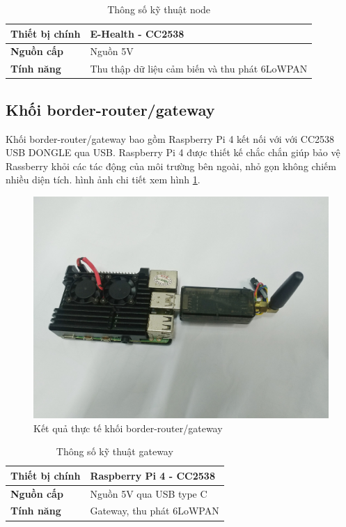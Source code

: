 \documentclass{report}
\begin{document}
\begin{table}[h]
	\centering
	\begin{tabular}{|l|l|}
		\hline
		\multicolumn{1}{|c|}{\textbf{Thiết bị chính}} & E-Health - CC2538                             \\ \hline
		\textbf{Nguồn cấp}                            & Nguồn 5V                                      \\ \hline
		\textbf{Tính năng}                            & Thu thập dữ liệu cảm biến và thu phát 6LoWPAN \\ \hline
	\end{tabular}
	\caption{Thông số kỹ thuật node}
	\label{table:tab5}
\end{table}
\newpage
\subsection{Khối border-router/gateway}
Khối border-router/gateway bao gồm Raspberry Pi 4 kết nối với với CC2538 USB DONGLE qua USB. Raspberry Pi 4 được thiết kế chắc chắn giúp bảo vệ Rassberry khỏi các tác động của môi trường bên ngoài, nhỏ gọn không chiếm nhiều diện tích. hình ảnh chi tiết xem hình \ref{fig:Graph55}. 
\begin{figure}[h]
	\centering
	\includegraphics[scale = 0.1]{fig55.png}
	\caption{Kết quả thực tế khối border-router/gateway}
	\label{fig:Graph55}
\end{figure}

\begin{table}[h]
	\centering
	\label{table:tb4}
	\begin{tabular}{|l|l|}
		\hline
		\multicolumn{1}{|c|}{\textbf{Thiết bị chính}} & Raspberry Pi 4 - CC2538   \\ \hline
		\textbf{Nguồn cấp}                            & Nguồn 5V qua USB type C   \\ \hline
		\textbf{Tính năng}                            & Gateway, thu phát 6LoWPAN \\ \hline
	\end{tabular}
	\caption{Thông số kỹ thuật gateway}
\end{table}
\newpage
\end{document}
